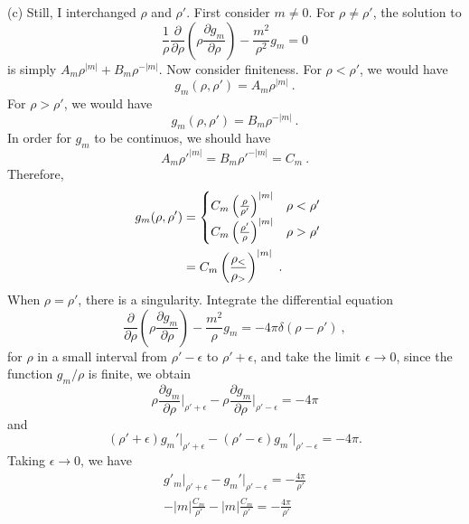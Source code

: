 \documentclass[12pt]{article}
\begin{document}
\newpage
{} (c) Still, I interchanged $\rho$ and $\rho'$. First consider $m \neq 0$. For $\rho \neq \rho'$, the solution to
\begin{equation}
    \frac{1}{\rho} \frac{\partial}{\partial \rho} \left(\rho \frac{\partial g_m}{\partial \rho}\right)-\frac{m^2}{\rho^2}g_m = 0
\end{equation}
is simply $A_m \rho^{|m|} + B_m \rho^{-|m|}$. Now consider finiteness. For $\rho < \rho'$, we would have
\begin{equation}
    g_m(\rho, \rho') = A_m \rho^{|m|}~.
\end{equation}
For $\rho > \rho'$, we would have
\begin{equation}
    g_m(\rho, \rho') = B_m \rho^{-|m|}~.
\end{equation}
In order for $g_m$  to be continuos, we should have
\begin{equation}
    A_m \rho'^{|m|} = B_m \rho'^{-|m|} = C_m~.
\end{equation}
Therefore,
\begin{align}
    g_m(\rho, \rho') &= \begin{cases}
        C_m \left(\frac{\rho}{\rho'}\right)^{|m|} & \rho < \rho'\\
        C_m \left(\frac{\rho'}{\rho}\right)^{|m|} & \rho > \rho'
    \end{cases} \cr
    & = C_m \left(\frac{\rho_<}{\rho_>}\right)^{|m|}~.
\end{align}
When $\rho = \rho'$, there is a singularity. Integrate the differential equation
\begin{equation}
    \frac{\partial}{\partial \rho} \left(\rho \frac{\partial g_m}{\partial \rho}\right)-\frac{m^2}{\rho}g_m = - 4 \pi \delta (\rho - \rho')~,
\end{equation}
for $\rho$ in a small interval from $\rho'-\epsilon$ to $\rho'+\epsilon$, and take the limit $\epsilon \to 0$, since the function $g_m / \rho$ is finite, we obtain
\begin{equation}
    \rho \frac{\partial g_m}{\partial \rho} \Bigg|_{\rho'+\epsilon} - \rho \frac{\partial g_m}{\partial \rho} \Bigg|_{\rho'-\epsilon} = -4\pi
\end{equation}
and
\begin{equation}
    (\rho' + \epsilon) g_m'\big |_{\rho' + \epsilon} - (\rho' - \epsilon) g_m'\big |_{\rho' - \epsilon} = - 4\pi.
\end{equation}
Taking $\epsilon \to 0$, we have
\begin{align}
    g'_m\big|_{\rho' + \epsilon} - g_m'\big|_{\rho' - \epsilon} = -\frac{4\pi}{\rho'}\\
    -|m| \frac{C_m}{\rho'} - |m| \frac{C_m}{\rho'} = - \frac{4\pi}{\rho'}
\end{align}
\end{document}
